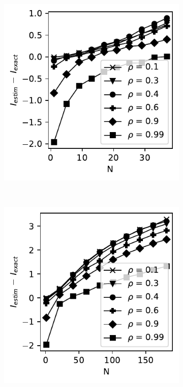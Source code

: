 \documentclass[../Thesis.tex]{subfiles}
\begin{document}
\begin{figure}[H]
    \centering
    \begin{subfigure}[t]{0.4\textwidth}
        \centering
        \includegraphics[width=\linewidth]{figures/ND examples/MI calc/gaussian example original all - error.pdf}
        \caption{}
    \end{subfigure}%
    ~
    \begin{subfigure}[t]{0.4\textwidth}
        \centering
        \includegraphics[width=\linewidth]{figures/ND examples/MI calc/gaussian example original all extended - error.pdf}
        \caption{}
    \end{subfigure}
    \caption{}
    \label{fig:raw hsitogram error for MI estimation}
\end{figure}
\end{document}
